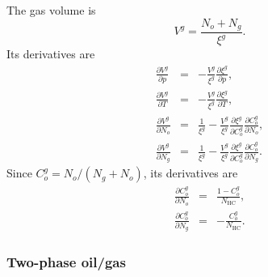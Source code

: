 The gas volume is
\begin{equation}
  V^g = \frac{N_o + N_g}{\xi^g}.
\end{equation}
Its derivatives are
\begin{eqnarray}
  \frac{\partial V^g}{\partial p} & = &
  -\frac{V^g}{\xi^g} \frac{\partial \xi^g}{\partial p}, \\
  \frac{\partial V^g}{\partial T} & = &
  -\frac{V^g}{\xi^g} \frac{\partial \xi^g}{\partial T}, \\
  \frac{\partial V^g}{\partial N_o} & = &
  \frac{1}{\xi^g} -
  \frac{V^g}{\xi^g} \frac{\partial \xi^g}{\partial C_o^g}
  \frac{\partial C_o^g}{\partial N_o}, \\
  \frac{\partial V^g}{\partial N_g} & = &
  \frac{1}{\xi^g} -
  \frac{V^g}{\xi^g} \frac{\partial \xi^g}{\partial C_o^g}
  \frac{\partial C_o^g}{\partial N_g}.
\end{eqnarray}
Since $C_o^g=N_o/(N_g+N_o)$, its derivatives are
\begin{eqnarray}
  \frac{\partial C_o^g}{\partial N_o} & = &
  \frac{1-C_o^g}{N_\text{HC}}, \\
  \frac{\partial C_o^g}{\partial N_g} & = &
  -\frac{C_o^g}{N_\text{HC}}.
\end{eqnarray}


\subsubsection{Two-phase oil/gas}

